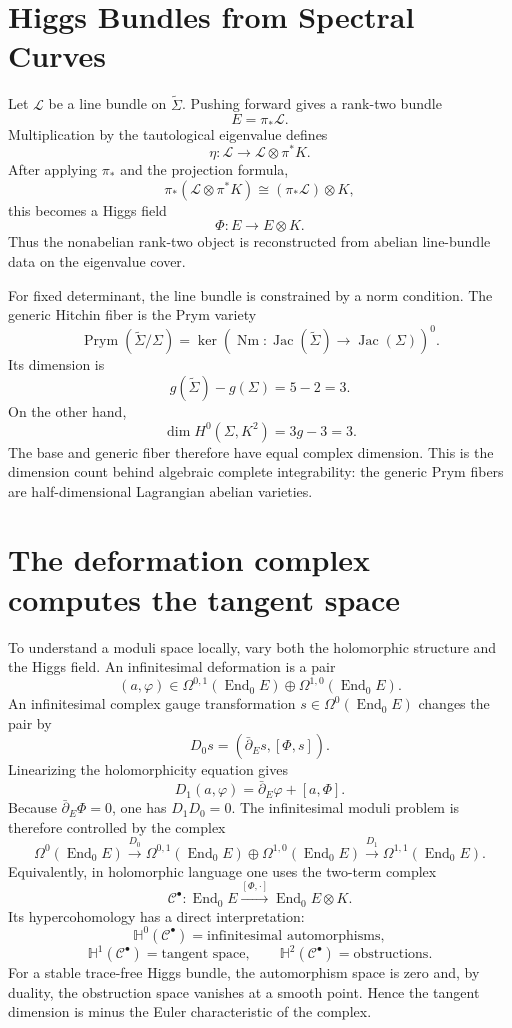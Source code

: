 \section{Higgs Bundles from Spectral Curves}

Let \(\mathcal L\) be a line bundle on \(\widetilde\Sigma\).  Pushing forward gives a rank-two bundle
\[
  E=\pi_*\mathcal L.
\]
Multiplication by the tautological eigenvalue defines
\[
  \eta:\mathcal L
  \longrightarrow
  \mathcal L\otimes\pi^*K.
\]
After applying \(\pi_*\) and the projection formula,
\[
  \pi_*(\mathcal L\otimes\pi^*K)
  \cong(\pi_*\mathcal L)\otimes K,
\]
this becomes a Higgs field
\[
  \Phi:E\longrightarrow E\otimes K.
\]
Thus the nonabelian rank-two object is reconstructed from abelian line-bundle data on the eigenvalue cover.

For fixed determinant, the line bundle is constrained by a norm condition.  The generic Hitchin fiber is the Prym variety
\[
  \operatorname{Prym}(\widetilde\Sigma/\Sigma)
  =\ker\!\left(
  \operatorname{Nm}:\operatorname{Jac}(\widetilde\Sigma)
  \to\operatorname{Jac}(\Sigma)
  \right)^0.
\]
Its dimension is
\[
  g(\widetilde\Sigma)-g(\Sigma)=5-2=3.
\]
On the other hand,
\[
  \dim H^0(\Sigma,K^2)=3g-3=3.
\]
The base and generic fiber therefore have equal complex dimension.  This is the dimension count behind algebraic complete integrability: the generic Prym fibers are half-dimensional Lagrangian abelian varieties.

\section{The deformation complex computes the tangent space}

To understand a moduli space locally, vary both the holomorphic structure and the Higgs field.  An infinitesimal deformation is a pair
\[
  (a,\varphi)
  \in
  \Omega^{0,1}(\operatorname{End}_0E)
  \oplus
  \Omega^{1,0}(\operatorname{End}_0E).
\]
An infinitesimal complex gauge transformation \(s\in\Omega^0(\operatorname{End}_0E)\) changes the pair by
\[
  D_0s=(\bar\partial_Es,[\Phi,s]).
\]
Linearizing the holomorphicity equation gives
\[
  D_1(a,\varphi)
  =\bar\partial_E\varphi+[a,\Phi].
\]
Because \(\bar\partial_E\Phi=0\), one has \(D_1D_0=0\).  The infinitesimal moduli problem is therefore controlled by the complex
\[
  \Omega^0(\operatorname{End}_0E)
  \xrightarrow{D_0}
  \Omega^{0,1}(\operatorname{End}_0E)
  \oplus
  \Omega^{1,0}(\operatorname{End}_0E)
  \xrightarrow{D_1}
  \Omega^{1,1}(\operatorname{End}_0E).
\]
Equivalently, in holomorphic language one uses the two-term complex
\[
  \mathcal C^\bullet:
  \operatorname{End}_0E
  \xrightarrow{[\Phi,\cdot]}
  \operatorname{End}_0E\otimes K.
\]
Its hypercohomology has a direct interpretation:
\[
  \mathbb H^0(\mathcal C^\bullet)=\text{infinitesimal automorphisms},
\]
\[
  \mathbb H^1(\mathcal C^\bullet)=\text{tangent space},
  \qquad
  \mathbb H^2(\mathcal C^\bullet)=\text{obstructions}.
\]
For a stable trace-free Higgs bundle, the automorphism space is zero and, by duality, the obstruction space vanishes at a smooth point.  Hence the tangent dimension is minus the Euler characteristic of the complex.

